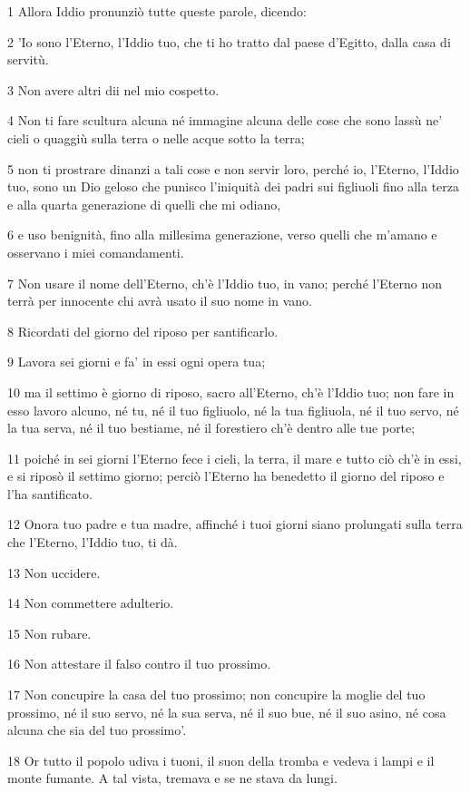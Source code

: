 \par 1 Allora Iddio pronunziò tutte queste parole, dicendo:
\par 2 'Io sono l'Eterno, l'Iddio tuo, che ti ho tratto dal paese d'Egitto, dalla casa di servitù.
\par 3 Non avere altri dii nel mio cospetto.
\par 4 Non ti fare scultura alcuna né immagine alcuna delle cose che sono lassù ne' cieli o quaggiù sulla terra o nelle acque sotto la terra;
\par 5 non ti prostrare dinanzi a tali cose e non servir loro, perché io, l'Eterno, l'Iddio tuo, sono un Dio geloso che punisco l'iniquità dei padri sui figliuoli fino alla terza e alla quarta generazione di quelli che mi odiano,
\par 6 e uso benignità, fino alla millesima generazione, verso quelli che m'amano e osservano i miei comandamenti.
\par 7 Non usare il nome dell'Eterno, ch'è l'Iddio tuo, in vano; perché l'Eterno non terrà per innocente chi avrà usato il suo nome in vano.
\par 8 Ricordati del giorno del riposo per santificarlo.
\par 9 Lavora sei giorni e fa' in essi ogni opera tua;
\par 10 ma il settimo è giorno di riposo, sacro all'Eterno, ch'è l'Iddio tuo; non fare in esso lavoro alcuno, né tu, né il tuo figliuolo, né la tua figliuola, né il tuo servo, né la tua serva, né il tuo bestiame, né il forestiero ch'è dentro alle tue porte;
\par 11 poiché in sei giorni l'Eterno fece i cieli, la terra, il mare e tutto ciò ch'è in essi, e si riposò il settimo giorno; perciò l'Eterno ha benedetto il giorno del riposo e l'ha santificato.
\par 12 Onora tuo padre e tua madre, affinché i tuoi giorni siano prolungati sulla terra che l'Eterno, l'Iddio tuo, ti dà.
\par 13 Non uccidere.
\par 14 Non commettere adulterio.
\par 15 Non rubare.
\par 16 Non attestare il falso contro il tuo prossimo.
\par 17 Non concupire la casa del tuo prossimo; non concupire la moglie del tuo prossimo, né il suo servo, né la sua serva, né il suo bue, né il suo asino, né cosa alcuna che sia del tuo prossimo'.
\par 18 Or tutto il popolo udiva i tuoni, il suon della tromba e vedeva i lampi e il monte fumante. A tal vista, tremava e se ne stava da lungi.
